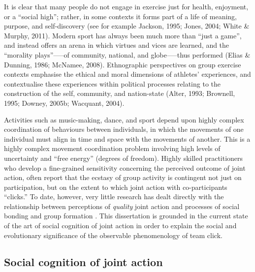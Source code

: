 It is clear that many people do not engage in exercise just for health, enjoyment, or a ``social high''; rather, in some contexts it forms part of a life of meaning, purpose, and self-discovery (see for example Jackson, 1995; Jones, 2004; White \& Murphy, 2011). Modern sport has always been much more than ``just a game'', and instead offers an arena in which virtues and vices are learned, and the ``morality plays''—--of community, national, and globe—--thus performed (Elias \& Dunning, 1986; McNamee, 2008).  Ethnographic perspectives on group exercise contexts emphasise the ethical and moral dimensions of athletes’ experiences, and contextualise these experiences within political processes relating to the construction of the self, community, and nation-state (Alter, 1993; Brownell, 1995; Downey, 2005b; Wacquant, 2004).

Activities such as music-making, dance, and sport depend upon highly complex coordination of behaviours between individuals, in which the movements of one individual must align in time and space with the movements of another. This is a highly complex movement coordination problem involving high levels of uncertainty and ``free energy'' (degrees of freedom). Highly skilled practitioners who develop a fine-grained sensitivity concerning the perceived outcome of joint action, often report that the ecstasy of group activity is contingent not just on participation, but on the extent to which joint action with co-participants ``clicks.'' To date, however, very little research has dealt directly with the relationship between perceptions of \textit{quality} joint action and processes of social bonding and group formation \citep[but see][]{Marsh2009}.
This dissertation is grounded in the current state of the art of social cognition of joint action in order to explain the social and evolutionary significance of the observable phenomenology of team click.

\subsection{Social cognition of joint action}

